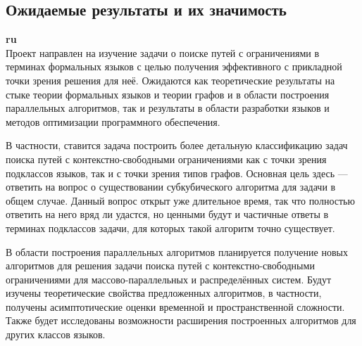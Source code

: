 \documentclass[12pt]{article}  %
\theoremstyle{remark}
\begin{document}
\subsection{Ожидаемые результаты и их значимость}

\textbf{ru}\\
%
Проект направлен на изучение задачи о поиске путей с ограничениями в терминах формальных языков с целью получения эффективного с прикладной точки зрения решения для неё.
Ожидаются как теоретические результаты на стыке теории формальных языков и теории графов и в области построения параллельных алгоритмов, так и результаты в области разработки языков и методов оптимизации программного обеспечения.

В частности, ставится задача построить более детальную классификацию задач поиска путей с контекстно-свободными ограничениями как с точки зрения подклассов языков, так и с точки зрения типов графов.
Основная цель здесь --- ответить на вопрос о существовании субкубического алгоритма для задачи в общем случае.
Данный вопрос открыт уже длительное время, так что полностью ответить на него вряд ли удастся, но ценными будут и частичные ответы в терминах подклассов задачи, для которых такой алгоритм точно существует.

В области построения параллельных алгоритмов планируется получение новых алгоритмов для решения задачи поиска путей с контекстно-свободными ограничениями для массово-параллельных и распределённых систем.
Будут изучены теоретические свойства предложенных алгоритмов, в частности, получены асимптотические оценки временной и пространственной сложности.
Также будет исследованы возможности расширения построенных алгоритмов для других классов языков.
\end{document}
